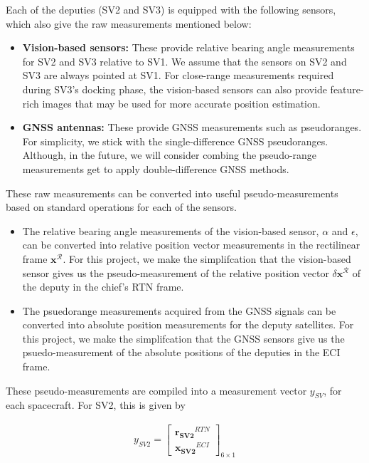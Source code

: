Each of the deputies (SV2 and SV3) is equipped with the following sensors, which also give the raw measurements mentioned below:
\begin{itemize}
    \item \textbf{Vision-based sensors:} These provide relative bearing angle measurements for SV2 and SV3 relative to SV1. We assume that the sensors on SV2 and SV3 are always pointed at SV1. For close-range measurements required during SV3's docking phase, the vision-based sensors can also provide feature-rich images that may be used for more accurate position estimation. 
    \item \textbf{GNSS antennas:} These provide GNSS measurements such as pseudoranges. For simplicity, we stick with the single-difference GNSS pseudoranges. Although, in the future, we will consider combing the pseudo-range measurements get to apply double-difference GNSS methods.
\end{itemize}

These raw measurements can be converted into useful pseudo-measurements based on standard operations for each of the sensors. 
\begin{itemize}
    \item The relative bearing angle measurements of the vision-based sensor, $\alpha$ and $\epsilon$, can be converted into relative position vector measurements in the rectilinear frame $\boldsymbol{x}^\mathcal{R}$. For this project, we make the simplifcation that the vision-based sensor gives us the pseudo-measurement of the relative position vector $\delta \boldsymbol{x}^\mathcal{R}$ of the deputy in the chief's RTN frame.
    \item The psuedorange measurements acquired from the GNSS signals can be converted into absolute position measurements for the deputy satellites. For this project, we make the simplifcation that the GNSS sensors give us the psuedo-measurement of the absolute positions of the deputies in the ECI frame.
\end{itemize}
These pseudo-measurements are compiled into a measurement vector $y_{SV}$, for each spacecraft. For SV2, this is given by

\begin{align}
    y_{SV2} = \begin{bmatrix}
        \boldsymbol{r_{SV2}}^{RTN}\\
        \boldsymbol{x_{SV2}}^{ECI}
    \end{bmatrix}_{6\times 1}
\end{align}

